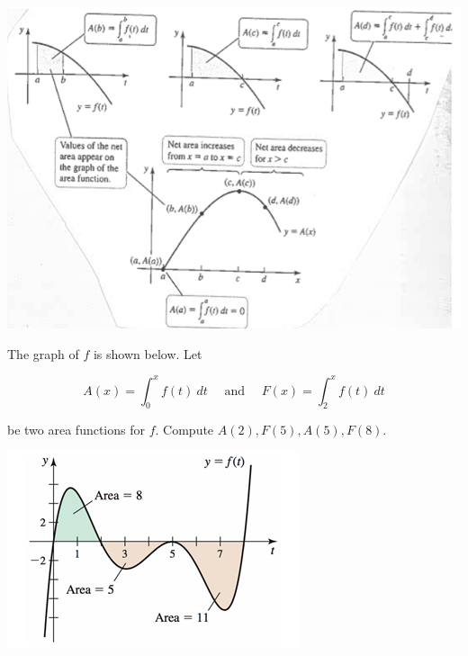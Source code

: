\documentclass[cal1spr16Lectures.tex]{subfiles}
\begin{document}
\begin{frame}
\begin{center}
\includegraphics[scale=1.25]{pictures/5p3example}
\end{center}
\end{frame}

\begin{frame}\footnotesize
\begin{ex} 
The graph of $f$ is shown below.  Let 

\vspace{-0.75pc}
\[A(x)=\int_0^x f(t)\ dt\quad\text{ and }\quad F(x)=\int_2^x f(t)\ dt\] 

\vspace{-0.25pc}
be two area functions for $f$.  Compute $A(2), F(5), A(5), F(8)$.

\vspace{-0.65pc}
\begin{center}
\includegraphics[scale=0.85]{pictures/Ch5Sect3_Exer12}
\end{center}
\end{ex}
\end{frame}
\end{document}
